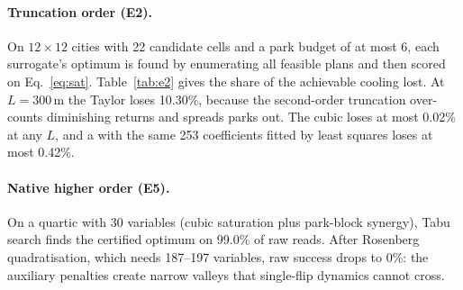\paragraph{Truncation order (E2).} On $12\times12$ cities with 22 candidate cells and a park
budget of at most 6, each surrogate's optimum is found by enumerating all feasible plans and then
scored on Eq.~\eqref{eq:sat}. Table~\ref{tab:e2} gives the share of the achievable cooling lost.
At $L=300$\,m the Taylor \QUBO{} loses 10.30\%, because the second-order truncation over-counts
diminishing returns and spreads parks out. The cubic \HUBO{} loses at most 0.02\% at any $L$, and a
\QUBO{} with the same 253 coefficients fitted by least squares loses at most 0.42\%.

\paragraph{Native higher order (E5).} On a quartic \HUBO{} with 30 variables (cubic saturation
plus park-block synergy), Tabu search finds the certified optimum on 99.0\% of raw reads. After
Rosenberg quadratisation, which needs 187--197 variables, raw success drops to 0\%: the auxiliary
penalties create narrow valleys that single-flip dynamics cannot cross.
